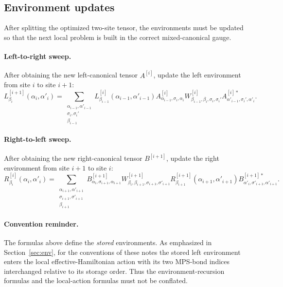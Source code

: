 \documentclass[aps,prb,onecolumn,nofootinbib]{revtex4-2}
\begin{document}
	\subsection{Environment updates}
	
	After splitting the optimized two-site tensor, the environments must be updated so that
	the next local problem is built in the correct mixed-canonical gauge.
	
	\paragraph{Left-to-right sweep.}
	After obtaining the new left-canonical tensor $A^{[i]}$, update the left environment from
	site $i$ to site $i+1$:
	\begin{equation}
		L^{[i+1]}_{\beta_i}(\alpha_i,\alpha'_i)
		=
		\sum_{\substack{
				\alpha_{i-1},\alpha'_{i-1}\\
				\sigma_i,\sigma_i'\\
				\beta_{i-1}
		}}
		L^{[i]}_{\beta_{i-1}}(\alpha_{i-1},\alpha'_{i-1})
		A^{[i]}_{\alpha_{i-1},\sigma_i,\alpha_i}
		W^{[i]}_{\beta_{i-1},\beta_i,\sigma_i,\sigma_i'}
		A^{[i]*}_{\alpha'_{i-1},\sigma_i',\alpha'_i}.
	\end{equation}
	
	\paragraph{Right-to-left sweep.}
	After obtaining the new right-canonical tensor $B^{[i+1]}$, update the right environment
	from site $i+1$ to site $i$:
	\begin{equation}
		R^{[i]}_{\beta_i}(\alpha_i,\alpha'_i)
		=
		\sum_{\substack{
				\alpha_{i+1},\alpha'_{i+1}\\
				\sigma_{i+1},\sigma'_{i+1}\\
				\beta_{i+1}
		}}
		B^{[i+1]}_{\alpha_i,\sigma_{i+1},\alpha_{i+1}}
		W^{[i+1]}_{\beta_i,\beta_{i+1},\sigma_{i+1},\sigma'_{i+1}}
		R^{[i+1]}_{\beta_{i+1}}(\alpha_{i+1},\alpha'_{i+1})
		B^{[i+1]*}_{\alpha'_i,\sigma'_{i+1},\alpha'_{i+1}}.
	\end{equation}
	
	\paragraph{Convention reminder.}
	The formulas above define the \emph{stored} environments. As emphasized in
	Section~\ref{sec:env}, for the conventions of these notes the stored left environment enters
	the local effective-Hamiltonian action with its two MPS-bond indices interchanged relative
	to its storage order. Thus the environment-recursion formulas and the local-action formulas
	must not be conflated.
	
\end{document}
